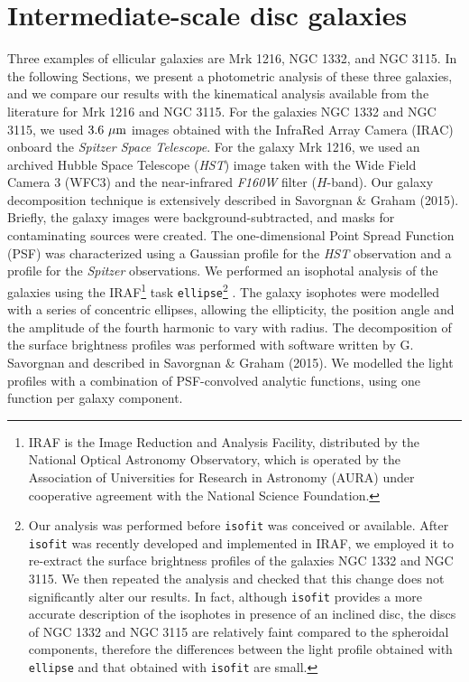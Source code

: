 \documentclass[useAMS,usenatbib,article]{mn2e}
\begin{document}
\section{Intermediate-scale disc galaxies}
\label{sec:gal}
Three examples of ellicular galaxies are Mrk 1216, NGC 1332, and NGC 3115. 
In the following Sections, we present a photometric analysis of these three galaxies, 
and we compare our results with the kinematical analysis available from the literature for Mrk 1216 and NGC 3115. 
For the galaxies NGC 1332 and NGC 3115, we used $3.6~\rm \mu m$ images obtained with the InfraRed Array Camera (IRAC) 
onboard the \emph{Spitzer Space Telescope}. 
For the galaxy Mrk 1216, we used an archived Hubble Space Telescope (\emph{HST}) image  
taken with the Wide Field Camera 3 (WFC3) and the near-infrared \emph{F160W} filter ($H$-band). 
Our galaxy decomposition technique is extensively described in Savorgnan \& Graham (2015).
Briefly, the galaxy images were background-subtracted, and masks for contaminating sources were created. 
The one-dimensional Point Spread Function (PSF) was characterized using a Gaussian profile for the \emph{HST} observation 
and a \cite{moffat1969} profile for the \emph{Spitzer} observations.
We performed an isophotal analysis of the galaxies using the IRAF\footnote{IRAF 
is the Image Reduction and Analysis Facility, distributed by the National Optical Astronomy Observatory, 
which is operated by the Association of Universities for Research in Astronomy (AURA) 
under cooperative agreement with the National Science Foundation.} task {\tt ellipse}\footnote{Our analysis 
was performed before {\tt isofit} \citep{ciambur2015} was conceived or available. 
After {\tt isofit} was recently developed and implemented in IRAF, 
we employed it to re-extract the surface brightness profiles of the galaxies NGC 1332 and NGC 3115. 
We then repeated the analysis and checked that this change does not significantly alter our results. 
In fact, although {\tt isofit} provides a more accurate description of the isophotes in presence of an inclined disc, 
the discs of NGC 1332 and NGC 3115 are relatively faint compared to the spheroidal components, 
therefore the differences between the light profile obtained with {\tt ellipse} and that obtained with {\tt isofit} are small. } 
\citep{taskellipse}. 
The galaxy isophotes were modelled with a series of concentric ellipses, 
allowing the ellipticity, the position angle and the amplitude of the fourth harmonic to vary with radius.  
The decomposition of the surface brightness profiles was performed with software written by G. Savorgnan 
and described in Savorgnan \& Graham (2015).
We modelled the light profiles with a combination of PSF-convolved analytic functions, 
using one function per galaxy component. 
\end{document}
